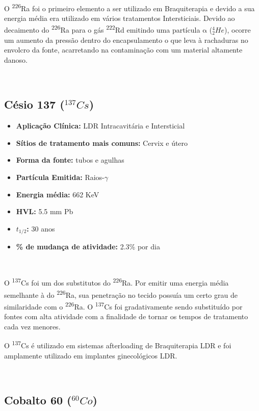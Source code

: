 \documentclass[11pt,a4paper]{article}
\begin{document}
			\

			O \textsuperscript{226}Ra foi o primeiro elemento a ser utilizado em Braquiterapia e devido a sua energia média era utilizado em vários tratamentos Intersticiais. Devido ao decaimento do \textsuperscript{226}Ra para o gás \textsuperscript{222}Rd emitindo uma partícula $\mathrm{\alpha}$ (${}_2^4He$), ocorre um aumento da pressão dentro do encapsulamento o que leva à rachaduras no envolcro da fonte, acarretando na contaminação com um material altamente danoso.

			\
		
		\subsection{Césio 137 \textbf{\textcolor{CarnationPink}{(${}^{137}Cs$)}}}

			\begin{itemize}
				\item \textbf{Aplicação Clínica:} LDR Intracavitária e Intersticial
				\item \textbf{Sítios de tratamento mais comuns:} Cervix e útero
				\item \textbf{Forma da fonte:} tubos e agulhas
				\item \textbf{Partícula Emitida:} Raios-$\gamma$
				\item \textbf{Energia média: } 662 KeV
				\item \textbf{HVL:} 5.5 mm Pb
				\item \textbf{$t_{1/2}$:} 30 anos
				\item \textbf{\% de mudança de atividade: } 2.3\% por dia
			\end{itemize}

			\

			O \textsuperscript{137}Cs foi um dos substitutos do \textsuperscript{226}Ra. Por emitir uma energia média semelhante à do \textsuperscript{226}Ra, sua penetração no tecido possuía um certo grau de similaridade com o \textsuperscript{226}Ra. O \textsuperscript{137}Cs foi gradativamente sendo substituído por fontes com alta atividade com a finalidade de tornar os tempos de tratamento cada vez menores.

			O \textsuperscript{137}Cs é utilizado em sistemas afterloading de Braquiterapia LDR e foi amplamente utilizado em implantes ginecológicos LDR.

			\

		\subsection{Cobalto 60 \textbf{\textcolor{CarnationPink}{(${}^{60}Co$)}}}
		
\end{document}
